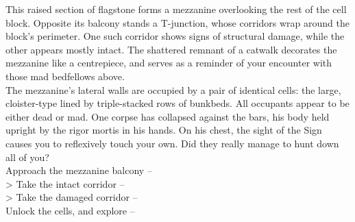 This raised section of flagstone forms a mezzanine overlooking the rest of the cell block. Opposite its balcony stands a T-junction, whose corridors wrap around the block’s perimeter. One such corridor shows signs of structural damage, while the other appears mostly intact. The shattered remnant of a catwalk decorates the mezzanine like a centrepiece, and serves as a reminder of your encounter with those mad bedfellows above.\\

The mezzanine's lateral walls are occupied by a pair of identical cells: the large, cloister-type lined by triple-stacked rows of bunkbeds. All occupants appear to be either dead or mad. One corpse has collapsed against the bars, his body held upright by the rigor mortis in his hands. On his chest, the sight of the Sign causes you to reflexively touch your own. Did they really manage to hunt down all of you?\\

 Approach the mezzanine balcony -- \\
> Take the intact corridor -- \\
> Take the damaged corridor -- \\
 Unlock the cells, and explore -- 